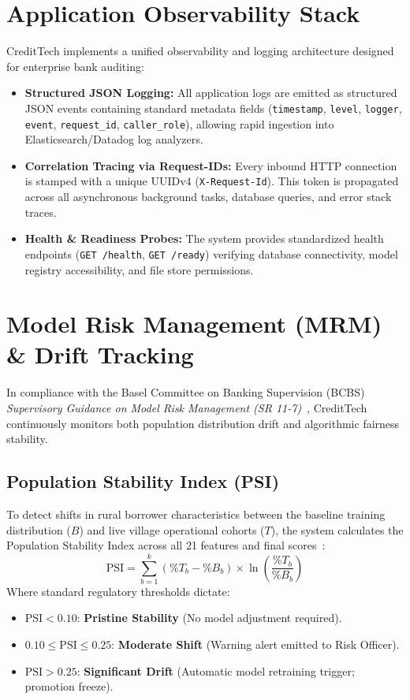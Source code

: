 \documentclass[11pt,a4paper,oneside]{report}
\begin{document}
\section{Application Observability Stack}
CreditTech implements a unified observability and logging architecture designed for enterprise bank auditing:
\begin{itemize}
  \item \textbf{Structured JSON Logging:} All application logs are emitted as structured JSON events containing standard metadata fields (\texttt{timestamp}, \texttt{level}, \texttt{logger}, \texttt{event}, \texttt{request\_id}, \texttt{caller\_role}), allowing rapid ingestion into Elasticsearch/Datadog log analyzers.
  \item \textbf{Correlation Tracing via Request-IDs:} Every inbound HTTP connection is stamped with a unique UUIDv4 (\texttt{X-Request-Id}). This token is propagated across all asynchronous background tasks, database queries, and error stack traces.
  \item \textbf{Health \& Readiness Probes:} The system provides standardized health endpoints (\texttt{GET /health}, \texttt{GET /ready}) verifying database connectivity, model registry accessibility, and file store permissions.
\end{itemize}

\section{Model Risk Management (MRM) \& Drift Tracking}
In compliance with the Basel Committee on Banking Supervision (BCBS) \textit{Supervisory Guidance on Model Risk Management (SR 11-7)}~\cite{bcbs_mrm_2011}, CreditTech continuously monitors both population distribution drift and algorithmic fairness stability.

\subsection{Population Stability Index (PSI)}
To detect shifts in rural borrower characteristics between the baseline training distribution ($B$) and live village operational cohorts ($T$), the system calculates the Population Stability Index across all 21 features and final scores~\cite{yurdakul_psi_2018}:
$$\text{PSI} = \sum_{b=1}^{k} \left( \% T_b - \% B_b \right) \times \ln\left( \frac{\% T_b}{\% B_b} \right)$$
Where standard regulatory thresholds dictate:
\begin{itemize}
  \item $\text{PSI} < 0.10$: \textbf{Pristine Stability} (No model adjustment required).
  \item $0.10 \le \text{PSI} \le 0.25$: \textbf{Moderate Shift} (Warning alert emitted to Risk Officer).
  \item $\text{PSI} > 0.25$: \textbf{Significant Drift} (Automatic model retraining trigger; promotion freeze).
\end{itemize}
\end{document}
